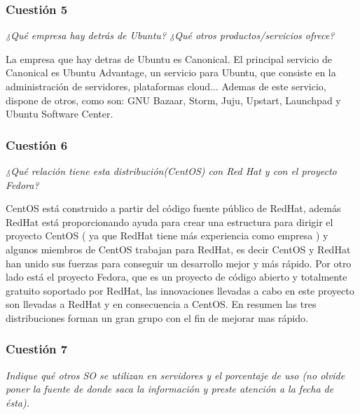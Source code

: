 \subsubsection{Cuestión 5}
\textit{¿Qué empresa hay detrás de Ubuntu? ¿Qué otros productos/servicios ofrece?} \newline

La empresa que hay detras de Ubuntu es Canonical. \cite{canonical}
El principal servicio de Canonical es Ubuntu Advantage, un servicio para Ubuntu, que consiste en la administración de servidores, plataformas cloud... \cite{canonical1}
Ademas de este servicio, dispone de otros, como son: GNU Bazaar, Storm, Juju, Upstart, Launchpad y Ubuntu Software Center.\cite{canonical2}

\subsubsection{Cuestión 6}
\textit{¿Qué relación tiene esta distribución(CentOS) con Red Hat y con el
proyecto Fedora?} \newline

CentOS está construido a partir del código fuente público de RedHat, además RedHat está proporcionando ayuda para crear una estructura para dirigir el proyecto CentOS ( ya que RedHat tiene más experiencia como empresa ) y algunos miembros de CentOS trabajan para RedHat, es decir CentOS y RedHat han unido sus fuerzas para conseguir un desarrollo mejor y más rápido. Por otro lado está el proyecto Fedora, que es un proyecto de código abierto y totalmente gratuito soportado por RedHat, las innovaciones llevadas a cabo en este proyecto son llevadas a RedHat y en consecuencia a CentOS. En resumen las tres distribuciones forman un gran grupo con el fin de mejorar mas rápido. \cite{fcentos} \cite{redhat1} \cite{redhat2}

\subsubsection{Cuestión 7}
\textit{Indique qué otros SO se utilizan en servidores y el porcentaje de uso (no olvide poner la fuente de donde saca la información y preste atención a la fecha de ésta).} \newline

